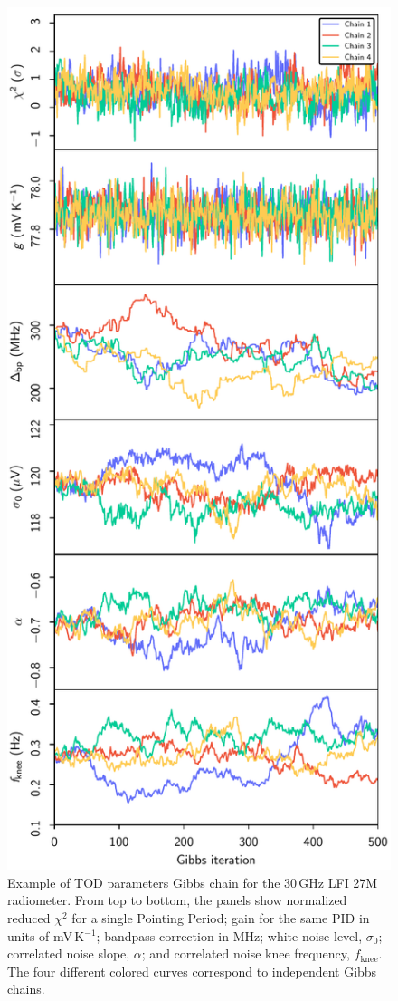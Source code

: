 \documentclass[twocolumn]{aa}
\begin{document}
\begin{figure}[t]
  \center
  \includegraphics[width=\linewidth]{figs/traceplot_BP10.pdf}
  \caption{Example of TOD parameters Gibbs chain for the 30\,GHz LFI 27M
    radiometer. From top to bottom, the panels show normalized reduced
    $\chi^2$ for a single Pointing Period; gain for the same PID in
    units of mV\,K$^{-1}$; bandpass correction in MHz; white noise
    level, $\sigma_0$; correlated noise slope, $\alpha$; and
    correlated noise knee frequency, $f_{\mathrm{knee}}$. The four
    different colored curves correspond to independent Gibbs
    chains.}\label{fig:traceplot}
\end{figure}
\end{document}
